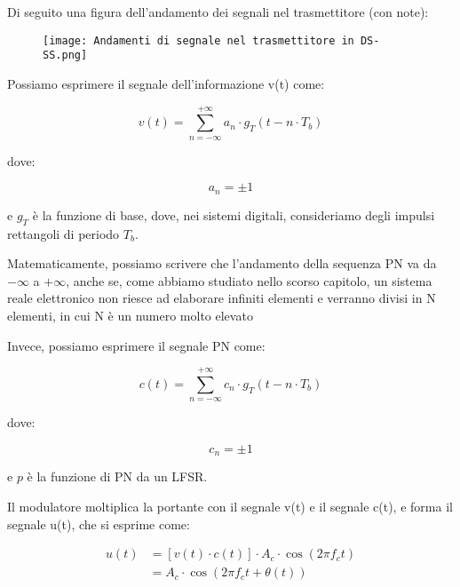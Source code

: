 Di seguito una figura dell'andamento dei segnali nel trasmettitore (con note): 

\begin{figure}[h]
    \centering
    \texttt{[image: Andamenti di segnale nel trasmettitore in DS-SS.png]}
\end{figure}

Possiamo esprimere il segnale dell'informazione v(t) come:

{
    \Large 
    \begin{equation}
    v(t) 
    = 
    \sum_{n = - \infty}^{+ \infty}
    a_n \cdot g_T(t - n \cdot T_b)       
    \end{equation}
}

dove: 

{
    \Large 
    \begin{equation}
        a_n = \pm 1
    \end{equation}
}

e $g_T$ è la funzione di base, dove, nei sistemi digitali, 
consideriamo degli impulsi rettangoli di periodo $T_b$. \newline 

\begin{tcolorbox}
    Matematicamente, 
    possiamo scrivere che l'andamento della sequenza PN va da $- \infty$ a $+ \infty$, 
    anche se, come abbiamo studiato nello scorso capitolo, un sistema reale elettronico non riesce ad elaborare infiniti elementi 
    e verranno divisi in N elementi, in cui N è un numero molto elevato
\end{tcolorbox}

Invece, possiamo esprimere il segnale PN come:

{
    \Large 
    \begin{equation}
    c(t) 
    = 
    \sum_{n = - \infty}^{+ \infty}
    c_n \cdot g_T(t - n \cdot T_b)       
    \end{equation}
}

dove: 

{
    \Large 
    \begin{equation}
        c_n = \pm 1
    \end{equation}
}

e $p$ è la funzione di PN da un LFSR. \newline 

Il modulatore moltiplica la portante con il segnale v(t) e il segnale c(t), 
e forma il segnale u(t), che si esprime come: 

{
    \Large 
    \begin{equation}
        \begin{split}
            u(t)
            &=
            \left[v(t) \cdot c(t)\right]
            \cdot 
            A_c \cdot \cos(2 \pi f_c t)
            \\
            &= 
            A_c \cdot \cos(2 \pi f_c t + \theta (t))
        \end{split}
    \end{equation}
}

